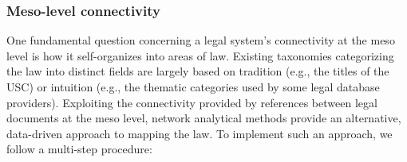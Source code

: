 \documentclass[utf8,sort&compress,table,hidelinks]{frontiersFPHY} %
\begin{document}
\vspace*{12pt}
\subsubsection{Meso-level connectivity}
\label{subsubsec:methods:connectivity:meso}

One fundamental question concerning a legal system's connectivity at the meso level is how it self-organizes into areas of law.
Existing taxonomies categorizing the law into distinct fields are largely based on tradition (e.g., the titles of the USC) or intuition (e.g., the thematic categories used by some legal database providers). 
Exploiting the connectivity provided by references between legal documents at the meso level, network analytical methods provide an alternative, data-driven approach to mapping the law.
To implement such an approach, 
we follow a multi-step procedure:
\end{document}

